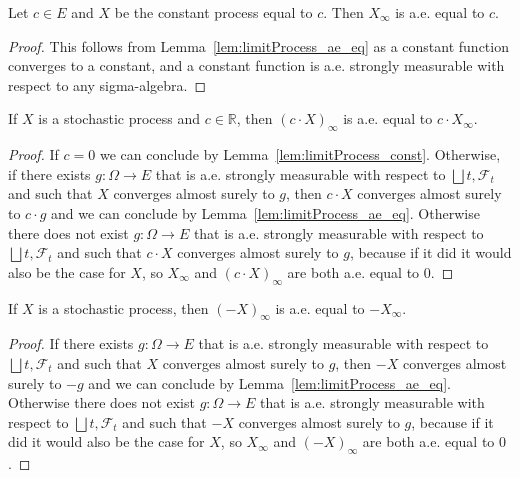 \begin{lemma}\label{lem:limitProcess_const}
  \mathlibok
  Let $c \in E$ and $X$ be the constant process equal to $c$. Then $X_\infty$ is a.e. equal to $c$.
\end{lemma}

\begin{proof}\mathlibok
  This follows from Lemma~\ref{lem:limitProcess_ae_eq} as a constant function converges to a constant, and a constant function is a.e. strongly measurable with respect to any sigma-algebra.
\end{proof}

\begin{lemma}\label{lem:limitProcess_smul}
  \mathlibok
  If $X$ is a stochastic process and $c \in \mathbb{R}$, then $(c \cdot X)_\infty$ is a.e. equal to $c \cdot X_\infty$.
\end{lemma}

\begin{proof}\mathlibok
  If $c = 0$ we can conclude by Lemma~\ref{lem:limitProcess_const}. Otherwise, if there exists $g : \Omega \to E$ that is a.e. strongly measurable with respect to $\bigsqcup t, \mathcal{F}_t$ and such that $X$ converges almost surely to $g$, then $c \cdot X$ converges almost surely to $c \cdot g$ and we can conclude by Lemma~\ref{lem:limitProcess_ae_eq}. Otherwise there does not exist $g : \Omega \to E$ that is a.e. strongly measurable with respect to $\bigsqcup t, \mathcal{F}_t$ and such that $c \cdot X$ converges almost surely to $g$, because if it did it would also be the case for $X$, so $X_\infty$ and $(c \cdot X)_\infty$ are both a.e. equal to $0$.
\end{proof}

\begin{lemma}\label{lem:limitProcess_neg}
  \mathlibok
  If $X$ is a stochastic process, then $(-X)_\infty$ is a.e. equal to $-X_\infty$.
\end{lemma}

\begin{proof}\mathlibok
  If there exists $g : \Omega \to E$ that is a.e. strongly measurable with respect to $\bigsqcup t, \mathcal{F}_t$ and such that $X$ converges almost surely to $g$, then $-X$ converges almost surely to $-g$ and we can conclude by Lemma~\ref{lem:limitProcess_ae_eq}. Otherwise there does not exist $g : \Omega \to E$ that is a.e. strongly measurable with respect to $\bigsqcup t, \mathcal{F}_t$ and such that $-X$ converges almost surely to $g$, because if it did it would also be the case for $X$, so $X_\infty$ and $(-X)_\infty$ are both a.e. equal to $0$.
\end{proof}


